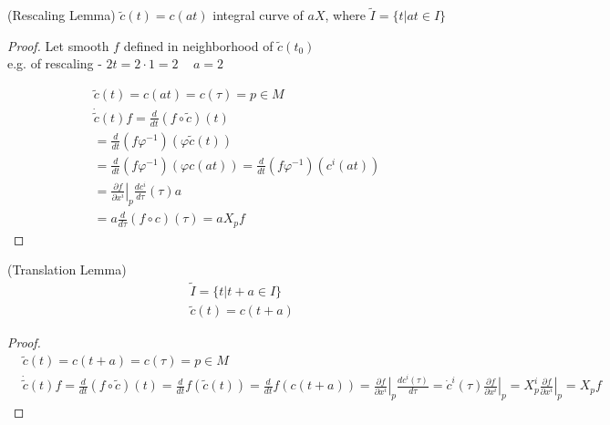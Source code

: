 \begin{lemma}[9.3] (Rescaling Lemma) 
$\widetilde{ c}(t) = c(at)$ integral curve of $aX$, where $\widetilde{I} = \lbrace t | at \in I \rbrace$
\end{lemma}
\begin{proof} Let smooth $f$ defined in neighborhood of $\widetilde{c}(t_0)$ \\
e.g. of rescaling  - $2t = 2\cdot 1 = 2 \quad \, a=2$ 

\[
\begin{gathered}
  \widetilde{c}(t) = c(at) = c(\tau) = p \in M \\ 
  \dot{ \widetilde{c}}(t) f = \frac{d}{dt} (f\circ \widetilde{c})(t) \\
  = \frac{d}{dt} (f\varphi^{-1})( \varphi\widetilde{c}(t)) \\
  = \frac{d}{dt} (f\varphi^{-1})(\varphi c(at) ) = \frac{d}{dt} (f\varphi^{-1})(c^i(at)) \\
  = \left. \frac{ \partial f}{ \partial x^i} \right|_p \frac{dc^i}{ d\tau}(\tau)a \\
  = a \frac{d}{d \tau}(f\circ c)(\tau) = aX_p f
\end{gathered}
\]


\end{proof}

\begin{lemma}[9.4] (Translation Lemma)
\[
\begin{aligned}
  & \widetilde{I} = \lbrace t | t + a \in I \rbrace \\ 
  & \widetilde{c}(t) = c(t+a)
\end{aligned}
\]



\end{lemma}

\begin{proof}
\[  
\begin{aligned}
&  \widetilde{c}(t) = c(t+a) = c(\tau) = p \in M \\ 
&  \dot{ \widetilde{c}}(t) f = \frac{d}{dt} (f\circ \widetilde{c})(t) = \frac{d}{dt} f(\widetilde{c}(t)) = \frac{d}{dt} f(c(t+a) ) = \left. \frac{ \partial f}{ \partial x^i } \right|_p \frac{d c^i(\tau) }{ d\tau } = \dot{c}^i(\tau)  \left. \frac{ \partial f}{ \partial x^i } \right|_p = X^i_p \left. \frac{ \partial f}{ \partial x^i} \right|_p = X_p f
\end{aligned}
\]
\end{proof}




